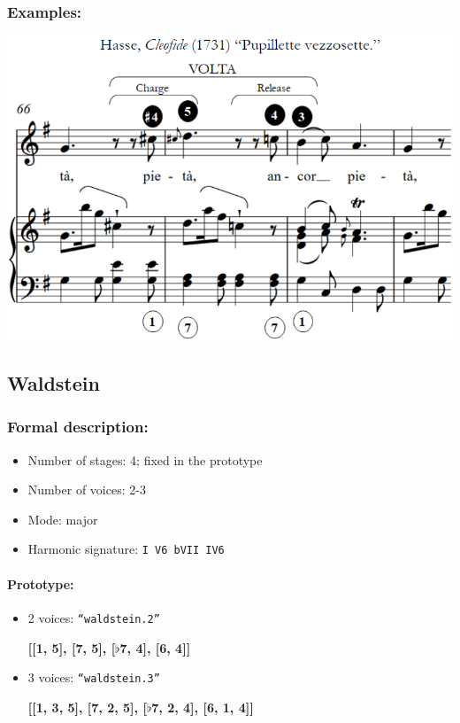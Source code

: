 ﻿\documentclass[11pt, openany]{article}
\begin{document}
\begin{itemize}
\subsubsection{Examples:}
\begin{center}
\includegraphics[scale=0.5]{volta.png}
\end{center}


	\subsection{Waldstein}
	
\subsubsection{Formal description:}
\begin{itemize}
\item Number of stages: 4; fixed in the prototype
\item Number of voices: 2-3
\item Mode: major
\item Harmonic signature: \texttt{I V6 bVII IV6}
\end{itemize}

\paragraph{Prototype:}
\begin{itemize}
\item 2 voices: \texttt{“waldstein.2”}
	\begin{center}
	\textbf{[[1, 5], [7, 5], [$\flat$7, 4], [6, 4]]}
	\end{center}
\item 3 voices: \texttt{“waldstein.3”}
	\begin{center}
	\textbf{[[1, 3, 5], [7, 2, 5], [$\flat$7, 2, 4], [6, 1, 4]]}
	\end{center}
\end{itemize}


\end{itemize}
\end{document}
